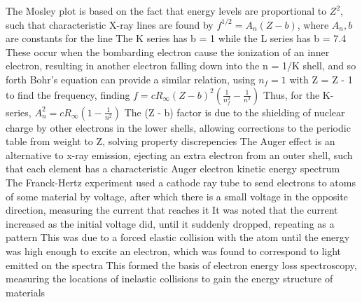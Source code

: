 \documentclass[11 pt, twoside]{article}
\newenvironment{outline*}
{
	\begin{outline}[enumerate]
	}
	{\end{outline}
}
\begin{document}
\begin{outline*}
	\2 The Mosley plot is based on the fact that energy levels are proportional to $Z^2$, such that characteristic X-ray lines are found by $f^{1/2} = A_n(Z - b)$, where $A_n, b$ are constants for the line
		\3 The K series has b = 1 while the L series has b = 7.4
		\3 These occur when the bombarding electron cause the ionization of an inner electron, resulting in another electron falling down into the n = 1/K shell, and so forth
	\2 Bohr's equation can provide a similar relation, using $n_f = 1$ with Z = Z - 1 to find the frequency, finding $f = cR_{\infty}(Z - b)^2(\frac{1}{n_f^2} - \frac{1}{n^2})$
		\3 Thus, for the K-series, $A^2_n = cR_{\infty}(1 - \frac{1}{n^2})$
		\3 The (Z - b) factor is due to the shielding of nuclear charge by other electrons in the lower shells, allowing corrections to the periodic table from weight to Z, solving property discrepencies
	\2 The Auger effect is an alternative to x-ray emission, ejecting an extra electron from an outer shell, such that each element has a characteristic Auger electron kinetic energy spectrum
\1 The Franck-Hertz experiment used a cathode ray tube to send electrons to atoms of some material by voltage, after which there is a small voltage in the opposite direction, measuring the current that reaches it
	\2 It was noted that the current increased as the initial voltage did, until it suddenly dropped, repeating as a pattern
	\2 This was due to a forced elastic collision with the atom until the energy was high enough to excite an electron, which was found to correspond to light emitted on the spectra
	\2 This formed the basis of electron energy loss spectroscopy, measuring the locations of inelastic collisions to gain the energy structure of materials
\end{outline*}
\end{document}
